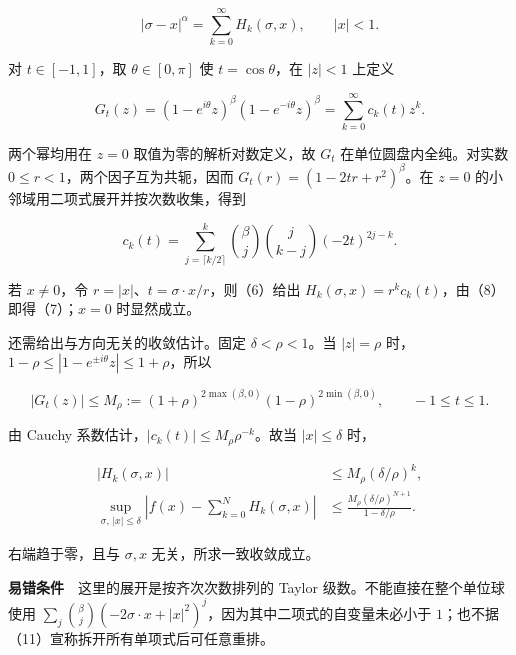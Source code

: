\documentclass[11pt,a4paper]{article}
\begin{document}
\begin{equation}
|\sigma-x|^\alpha=\sum_{k=0}^{\infty}H_k(\sigma,x),
\qquad |x|<1.
\tag{7}
\end{equation}

对 \(t\in[-1,1]\)，取 \(\theta\in[0,\pi]\) 使 \(t=\cos\theta\)，在
\(|z|<1\) 上定义

\begin{equation}
G_t(z)=(1-e^{i\theta}z)^\beta(1-e^{-i\theta}z)^\beta
=\sum_{k=0}^{\infty}c_k(t)z^k.
\tag{8}
\end{equation}

两个幂均用在 \(z=0\) 取值为零的解析对数定义，故 \(G_t\)
在单位圆盘内全纯。对实数 \(0\le r<1\)，两个因子互为共轭，因而
\(G_t(r)=(1-2tr+r^2)^\beta\)。在 \(z=0\)
的小邻域用二项式展开并按次数收集，得到

\begin{equation}
c_k(t)=\sum_{j=\lceil k/2\rceil}^{k}
\binom{\beta}{j}\binom{j}{k-j}(-2t)^{2j-k}.
\tag{9}
\end{equation}

若 \(x\ne0\)，令 \(r=|x|\)、\(t=\sigma\cdot x/r\)，则（6）给出
\(H_k(\sigma,x)=r^kc_k(t)\)，由（8）即得（7）；\(x=0\) 时显然成立。

还需给出与方向无关的收敛估计。固定 \(\delta<\rho<1\)。当 \(|z|=\rho\)
时，\(1-\rho\le|1-e^{\pm i\theta}z|\le1+\rho\)，所以

\begin{equation}
|G_t(z)|\le M_\rho:=(1+\rho)^{2\max(\beta,0)}
(1-\rho)^{2\min(\beta,0)},\qquad -1\le t\le1.
\tag{10}
\end{equation}

由 Cauchy 系数估计，\(|c_k(t)|\le M_\rho\rho^{-k}\)。故当
\(|x|\le\delta\) 时，

\begin{equation}
\begin{aligned}
|H_k(\sigma,x)|&\le M_\rho(\delta/\rho)^k,\\
\sup_{\sigma,\,|x|\le\delta}
\left|f(x)-\sum_{k=0}^{N}H_k(\sigma,x)\right|
&\le\frac{M_\rho(\delta/\rho)^{N+1}}{1-\delta/\rho}.
\end{aligned}
\tag{11}
\end{equation}

右端趋于零，且与 \(\sigma,x\) 无关，所求一致收敛成立。

\textbf{易错条件}　这里的展开是按齐次次数排列的 Taylor
级数。不能直接在整个单位球使用
\(\sum_j\binom\beta j(-2\sigma\cdot x+|x|^2)^j\)，因为其中二项式的自变量未必小于
\(1\)；也不据（11）宣称拆开所有单项式后可任意重排。
\end{document}
